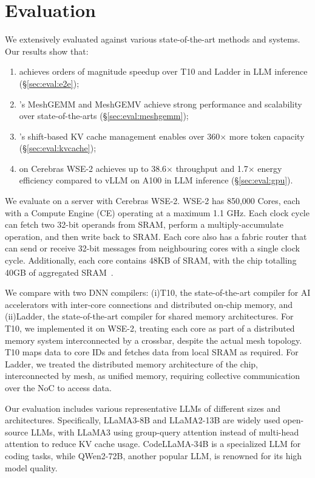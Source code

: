 \section{Evaluation}
We extensively evaluated \sys against various state-of-the-art methods and systems. Our results show that:
\begin{enumerate}[label=(\arabic*), leftmargin=0.5cm, noitemsep,topsep=0pt]
\item \sys{} achieves orders of magnitude speedup over T10 and Ladder in LLM inference (\S\ref{sec:eval:e2e});
\item \sys{}'s MeshGEMM and MeshGEMV achieve strong performance and scalability over state-of-the-arts (\S\ref{sec:eval:meshgemm});
\item \sys{}'s shift-based KV cache management enables over 360$\times$ more token capacity (\S\ref{sec:eval:kvcache});
\item \sys{} on Cerebras WSE-2 achieves up to 38.6$\times$ throughput and 1.7$\times$ energy efficiency compared to vLLM on A100 in LLM inference (\S\ref{sec:eval:gpu}).
\end{enumerate}

We evaluate \sys on a server with Cerebras WSE-2. WSE-2 has 850,000 Cores, each with a Compute Engine (CE) operating at a maximum 1.1 GHz. Each clock cycle can fetch two 32-bit operands from SRAM, perform a multiply-accumulate operation, and then write back to SRAM. Each core also has a fabric router that can send or receive 32-bit messages from neighbouring cores with a single clock cycle. Additionally, each core contains 48KB of SRAM, with the chip totalling 40GB of aggregated SRAM~\cite{wse}.

We compare \sys{} with two DNN compilers: (i)T10\cite{t10}, the state-of-the-art compiler for AI accelerators with inter-core connections and distributed on-chip memory, and (ii)Ladder\cite{ladder}, the state-of-the-art compiler for shared memory architectures. For T10, we implemented it on WSE-2, treating each core as part of a distributed memory system interconnected by a crossbar, despite the actual mesh topology. T10 maps data to core IDs and fetches data from local SRAM as required. For Ladder, we treated the distributed memory architecture of the chip, interconnected by mesh, as unified memory, requiring collective communication over the NoC to access data.

Our evaluation includes various representative LLMs of different sizes and architectures. Specifically, LLaMA3-8B and LLaMA2-13B are widely used open-source LLMs, with LLaMA3 using group-query attention instead of multi-head attention to reduce KV cache usage. CodeLLaMA-34B is a specialized LLM for coding tasks, while QWen2-72B, another popular LLM, is renowned for its high model quality.

